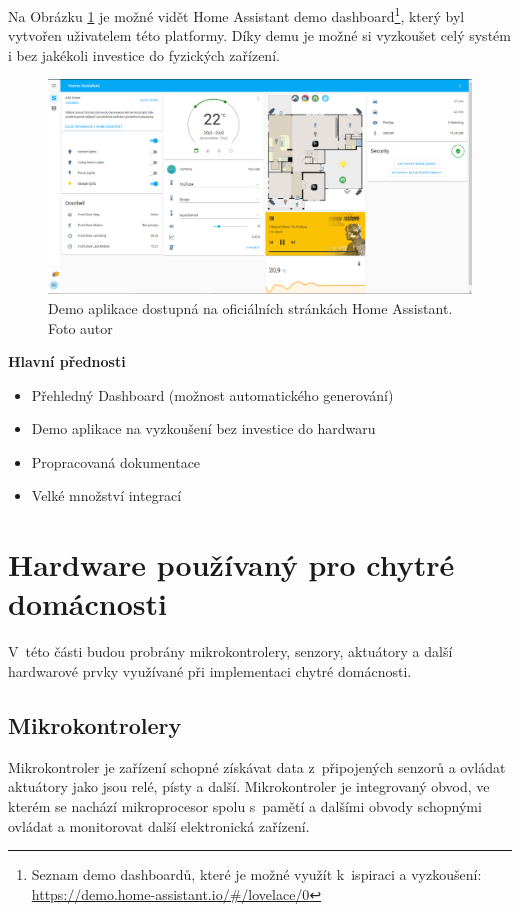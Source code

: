 Na Obrázku \ref{homeAssistantImage} je možné vidět Home Assistant demo dashboard\footnote{Seznam demo dashboardů, které je možné využít k~ispiraci a vyzkoušení: \url{https://demo.home-assistant.io/\#/lovelace/0}}, který byl vytvořen uživatelem této platformy. Díky demu je možné si vyzkoušet celý systém i bez jakékoli investice do fyzických zařízení.
\begin{figure}[H]
	\centering
	\includegraphics[width=\textwidth]{obrazky-figures/smartHomeSystems/homeAssistant.png}
	\caption{Demo aplikace dostupná na oficiálních stránkách Home Assistant. Foto autor}
	\label{homeAssistantImage}
\end{figure}

\noindent\textbf{Hlavní přednosti}
\begin{itemize}
  \item Přehledný Dashboard (možnost automatického generování)
  \item Demo aplikace na vyzkoušení bez investice do hardwaru
  \item Propracovaná dokumentace
  \item Velké množství integrací
  \end{itemize}

\section{Hardware používaný pro chytré domácnosti}
V~této části budou probrány mikrokontrolery, senzory, aktuátory a další hardwarové prvky využívané při implementaci chytré domácnosti.

\subsection*{Mikrokontrolery} \label{microcontrolers}
Mikrokontroler je zařízení schopné získávat data z~připojených senzorů a ovládat aktuátory jako jsou relé, písty a další. Mikrokontroler je integrovaný obvod, ve kterém se nachází mikroprocesor spolu s~pamětí a dalšími obvody schopnými ovládat a monitorovat další elektronická zařízení\cite{microcontroller-definition}.

